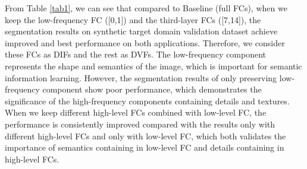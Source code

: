 \documentclass[letterpaper]{article} %
\begin{document}
\begin{table}[htbp]
    \small
    \centering
    \caption{Comparison results of different FCs combinations on cardiac and abdominal multi-organ datasets.}
    \label{tab1}%
  \end{table}%
  

From Table \ref{tab1}, we can see that compared to Baseline (full FCs), when we keep the low-frequency FC ([0,1]) and the third-layer FCs ([7,14]), 
the segmentation results on synthetic target domain validation dataset achieve improved and best performance on both applications. Therefore, 
we consider these FCs as DIFs and the rest as DVFs. The low-frequency component represents the shape and semantics of the image, which is 
important for semantic information learning. However, the segmentation results of only preserving low-frequency component show poor performance, 
which demonstrates the significance of the high-frequency components containing details and textures. When we keep different high-level FCs 
combined with low-level FC, the performance is consistently improved compared with the results only with different high-level FCs and only 
with low-level FC, which both validates the importance of semantics containing in low-level FC and details containing in high-level FCs.
\end{document}
